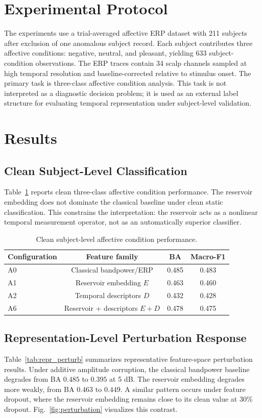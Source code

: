 \section{Experimental Protocol}
The experiments use a trial-averaged affective ERP dataset with 211 subjects after exclusion of one anomalous subject record. Each subject contributes three affective conditions: negative, neutral, and pleasant, yielding 633 subject-condition observations. The ERP traces contain 34 scalp channels sampled at high temporal resolution and baseline-corrected relative to stimulus onset. The primary task is three-class affective condition analysis. This task is not interpreted as a diagnostic decision problem; it is used as an external label structure for evaluating temporal representation under subject-level validation.

\section{Results}
\subsection{Clean Subject-Level Classification}
Table~\ref{tab:clean} reports clean three-class affective condition performance. The reservoir embedding does not dominate the classical baseline under clean static classification. This constrains the interpretation: the reservoir acts as a nonlinear temporal measurement operator, not as an automatically superior classifier.

\begin{table}[t]
\caption{Clean subject-level affective condition performance.}
\label{tab:clean}
\centering
\begin{tabular}{lccc}
\toprule
Configuration & Feature family & BA & Macro-F1 \\
\midrule
A0 & Classical bandpower/ERP & 0.485 & 0.483 \\
A1 & Reservoir embedding $E$ & 0.463 & 0.460 \\
A2 & Temporal descriptors $D$ & 0.432 & 0.428 \\
A6 & Reservoir + descriptors $E{+}D$ & 0.478 & 0.475 \\
\bottomrule
\end{tabular}
\end{table}

\subsection{Representation-Level Perturbation Response}
Table~\ref{tab:repr_perturb} summarizes representative feature-space perturbation results. Under additive amplitude corruption, the classical bandpower baseline degrades from BA $0.485$ to $0.395$ at 5 dB. The reservoir embedding degrades more weakly, from BA $0.463$ to $0.449$. A similar pattern occurs under feature dropout, where the reservoir embedding remains close to its clean value at 30\% dropout. Fig.~\ref{fig:perturbation} visualizes this contrast.

